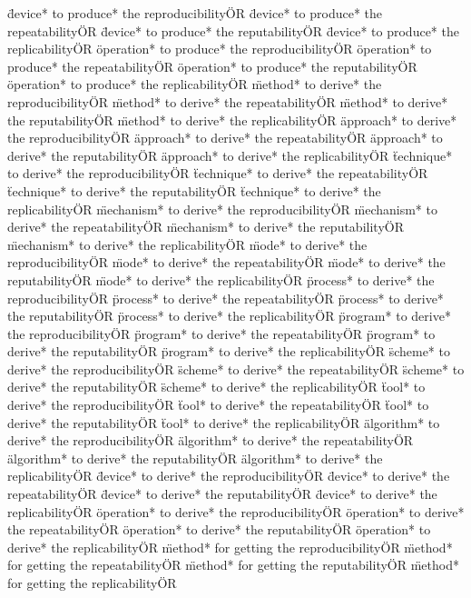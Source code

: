 \documentclass[
10pt, %
a4paper, %
oneside, %
headinclude,footinclude, %
BCOR5mm, %
]{scrartcl}
\begin{document}
\"device* to produce* the reproducibility\" OR \"device* to produce* the repeatability\" OR \"device* to produce* the reputability\" OR \"device* to produce* the replicability\" OR 
\"operation* to produce* the reproducibility\" OR \"operation* to produce* the repeatability\" OR \"operation* to produce* the reputability\" OR \"operation* to produce* the replicability\" OR 
\"method* to derive* the reproducibility\" OR \"method* to derive* the repeatability\" OR \"method* to derive* the reputability\" OR \"method* to derive* the replicability\" OR 
\"approach* to derive* the reproducibility\" OR \"approach* to derive* the repeatability\" OR \"approach* to derive* the reputability\" OR \"approach* to derive* the replicability\" OR 
\"technique* to derive* the reproducibility\" OR \"technique* to derive* the repeatability\" OR \"technique* to derive* the reputability\" OR \"technique* to derive* the replicability\" OR 
\"mechanism* to derive* the reproducibility\" OR \"mechanism* to derive* the repeatability\" OR \"mechanism* to derive* the reputability\" OR \"mechanism* to derive* the replicability\" OR 
\"mode* to derive* the reproducibility\" OR \"mode* to derive* the repeatability\" OR \"mode* to derive* the reputability\" OR \"mode* to derive* the replicability\" OR 
\"process* to derive* the reproducibility\" OR \"process* to derive* the repeatability\" OR \"process* to derive* the reputability\" OR \"process* to derive* the replicability\" OR 
\"program* to derive* the reproducibility\" OR \"program* to derive* the repeatability\" OR \"program* to derive* the reputability\" OR \"program* to derive* the replicability\" OR 
\"scheme* to derive* the reproducibility\" OR \"scheme* to derive* the repeatability\" OR \"scheme* to derive* the reputability\" OR \"scheme* to derive* the replicability\" OR 
\"tool* to derive* the reproducibility\" OR \"tool* to derive* the repeatability\" OR \"tool* to derive* the reputability\" OR \"tool* to derive* the replicability\" OR 
\"algorithm* to derive* the reproducibility\" OR \"algorithm* to derive* the repeatability\" OR \"algorithm* to derive* the reputability\" OR \"algorithm* to derive* the replicability\" OR 
\"device* to derive* the reproducibility\" OR \"device* to derive* the repeatability\" OR \"device* to derive* the reputability\" OR \"device* to derive* the replicability\" OR 
\"operation* to derive* the reproducibility\" OR \"operation* to derive* the repeatability\" OR \"operation* to derive* the reputability\" OR \"operation* to derive* the replicability\" OR 
\"method* for getting the reproducibility\" OR \"method* for getting the repeatability\" OR \"method* for getting the reputability\" OR \"method* for getting the replicability\" OR 
\end{document}
